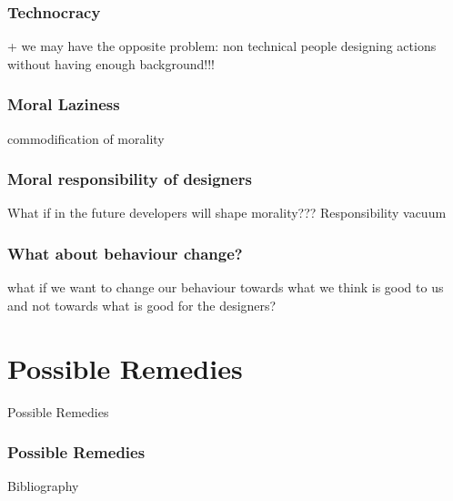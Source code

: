 \documentclass{beamer}
\begin{document}
\begin{frame}
	\frametitle{Technocracy}
 + we may have the opposite problem: non technical people designing actions without having enough background!!!	
\end{frame}

\begin{frame}
\frametitle{Moral Laziness}
commodification of morality
\end{frame}

\begin{frame}
	\frametitle{Moral responsibility of designers}
	What if in the future developers will shape morality??? Responsibility vacuum	
\end{frame}

\begin{frame}
\frametitle{What about behaviour change?}
what if we want to change our behaviour towards what we think is good to us and not towards what is good for the designers?
\end{frame}

\section{Possible Remedies}
\begin{frame}
\begin{center} 
	 Possible Remedies
\end{center}
\end{frame}

\begin{frame}
\frametitle{Possible Remedies}
\end{frame}

\nocite{*}
\begin{frame}{Bibliography}
\renewcommand*{\bibfont}{\normalsize}
\printbibliography
\end{frame}
\end{document}
